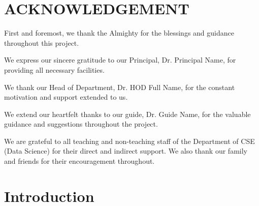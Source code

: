 \documentclass[12pt,a4paper]{report}
\newcommand{\GuideName}{Dr. Guide Name}
\newcommand{\HODName}{Dr. HOD Full Name}
\newcommand{\PrincipalName}{Dr. Principal Name}
\begin{document}

\clearpage
{}
\setcounter{page}{1}
\pagestyle{mainstyle}

\chapter*{ACKNOWLEDGEMENT}

\setlength{\parindent}{1.5em}
\setlength{\parskip}{0.8em}

First and foremost, we thank the Almighty for the blessings and guidance throughout this project.

We express our sincere gratitude to our Principal, \PrincipalName, for providing all necessary facilities.

We thank our Head of Department, \HODName, for the constant motivation and support extended to us.

We extend our heartfelt thanks to our guide, \GuideName, for the valuable guidance and suggestions throughout the project.

We are grateful to all teaching and non-teaching staff of the Department of CSE (Data Science) for their direct and indirect support. We also thank our family and friends for their encouragement throughout.

\setlength{\parindent}{0pt}
\setlength{\parskip}{6pt}
\onehalfspacing


\clearpage
\begingroup
{}
\setlength{\parskip}{0pt}
\pagestyle{mainstyle}
\thispagestyle{mainstyle}
\renewcommand{\contentsname}{CONTENTS}
\tableofcontents
\endgroup

\clearpage
\hypersetup{pageanchor=true}
\setcounter{page}{1}
\pagestyle{mainstyle}

\chapter{Introduction}
\end{document}
